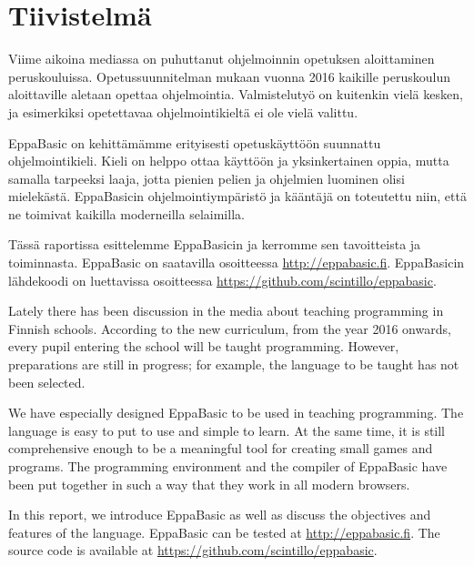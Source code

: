 
\section*{Tiivistelmä}
Viime aikoina mediassa on puhuttanut
ohjelmoinnin opetuksen aloittaminen
peruskouluissa.
Opetussuunnitelman mukaan vuonna
2016 kaikille peruskoulun aloittaville
aletaan opettaa ohjelmointia.
Valmistelutyö on kuitenkin vielä kesken,
ja esimerkiksi opetettavaa
ohjelmointikieltä ei ole vielä valittu.

EppaBasic on kehittämämme erityisesti
opetuskäyttöön suunnattu
ohjelmointikieli.
Kieli on helppo ottaa käyttöön
ja yksinkertainen oppia,
mutta samalla tarpeeksi laaja,
jotta pienien pelien ja ohjelmien
luominen olisi mielekästä.
EppaBasicin ohjelmointiympäristö ja kääntäjä
on toteutettu niin, että ne toimivat
kaikilla moderneilla selaimilla.

Tässä raportissa esittelemme EppaBasicin
ja kerromme sen tavoitteista ja toiminnasta.
EppaBasic on saatavilla osoitteessa \url{http://eppabasic.fi}.
EppaBasicin lähdekoodi on luettavissa
osoitteessa \url{https://github.com/scintillo/eppabasic}.

\vspace{50px}

Lately there has been discussion
in the media
about teaching programming in
Finnish schools.
According to the new curriculum,
from the year 2016 onwards,
every pupil entering the school
will be taught programming.
However, preparations
are still in progress;
for example, the language to
be taught has not been selected.

We have especially designed EppaBasic to be
used in teaching programming.
The language is easy to put to use
and simple to learn.
At the same time, it is still
comprehensive enough to be
a meaningful tool for creating
small games and programs.
The programming environment
and the compiler of EppaBasic
have been put together in such
a way that they work in all
modern browsers.

In this report, we introduce EppaBasic
as well as discuss the objectives
and features of the language.
EppaBasic can be tested at
\url{http://eppabasic.fi}.
The source code is available at
\url{https://github.com/scintillo/eppabasic}.